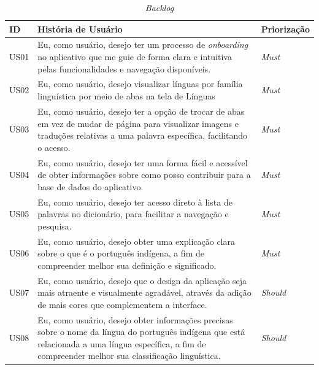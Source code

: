 \begin{table}[h!]
	\centering
	\caption{\textit{Backlog}}
	\label{tab06}
	\begin{tabularx}{\textwidth}{p{1cm}|p{12cm}|p{1cm}}
	\hline
	ID   & História de Usuário                                                                                                                                                                                                   & Priorização \\ \hline
	US01 & Eu, como usuário, desejo ter um processo de \textit{onboarding} no aplicativo que me guie de forma clara e intuitiva pelas funcionalidades e navegação disponíveis.                                                            & \textit{Must}        \\
	US02 & Eu, como usuário, desejo visualizar línguas por família linguística por meio de abas na tela de Línguas                                                                                                               & \textit{Must}        \\
	US03 & Eu, como usuário, desejo ter a opção de trocar de abas em vez de mudar de página para visualizar imagens e traduções relativas a uma palavra específica, facilitando o acesso.                                        & \textit{Must}        \\
	US04 & Eu, como usuário, desejo ter uma forma fácil e acessível de obter informações sobre como posso contribuir para a base de dados do aplicativo.                                                                         & \textit{Must}        \\
	US05 & Eu, como usuário, desejo ter acesso direto à lista de palavras no dicionário, para facilitar a navegação e pesquisa.																									 & \textit{Must}        \\
	US06 & Eu, como usuário, desejo obter uma explicação clara sobre o que é o português indígena, a fim de compreender melhor sua definição e significado.                                                                      & \textit{Must}        \\
	US07 & Eu, como usuário, desejo que o design da aplicação seja mais atraente e visualmente agradável, através da adição de mais cores que complementem a interface.                                                          & \textit{Should}      \\
	US08 & Eu, como usuário, desejo obter informações precisas sobre o nome da língua do português indígena que está relacionada a uma língua específica, a fim de compreender melhor sua classificação linguística. 			 & \textit{Should}      \\

\end{tabularx}
\end{table}
